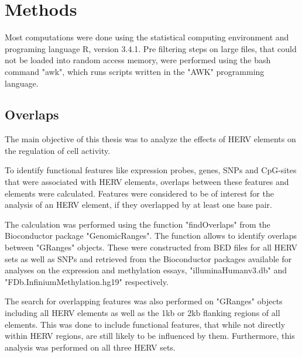 \documentclass[a4paper,12pt]{article}
\begin{document}
\newpage
\section{Methods}
Most computations were done using the statistical computing environment and programing language R, version 3.4.1\cite{Rlanguage}. Pre filtering steps on large files, that could not be loaded into random access memory, were performed using the bash command "awk", which runs scripts written in the "AWK" programming language.

\subsection{Overlaps}
The main objective of this thesis was to analyze the effects of HERV elements on the regulation of cell activity. 

To identify functional features like expression probes, genes, SNPs and CpG-sites that were associated with HERV elements, overlaps between these features and elements were calculated. Features were considered to be of interest for the analysis of an HERV element, if they overlapped by at least one base pair.

The calculation was performed using the function "findOverlaps" from the Bioconductor package "GenomicRanges"\cite{10.1371/journal.pcbi.1003118}. The function allows to identify overlaps between "GRanges" objects. These were constructed from BED files for all HERV sets as well as SNPs and retrieved from the Bioconductor packages available for analyses on the expression and methylation essays, "illuminaHumanv3.db"\cite{illuminaHumanv3.db} and "FDb.InfiniumMethylation.hg19"\cite{FDb.InfiniumMethylation.hg19} respectively.

The search for overlapping features was also performed on "GRanges" objects including all HERV elements as well as the 1kb or 2kb flanking regions of all elements. This was done to include functional features, that while not directly within HERV regions, are still likely to be influenced by them. Furthermore, this analysis was performed on all three HERV sets.
\end{document}
